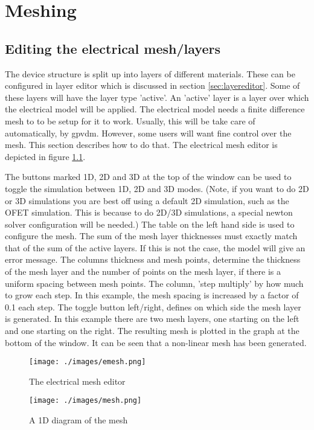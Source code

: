 \chapter{Meshing}
\label{ref:mesh}
\section{Editing the electrical mesh/layers}
The device structure is split up into layers of different materials.  These can be configured in layer editor which is discussed in section \ref{sec:layereditor}.  Some of these layers will have the layer type 'active'.  An 'active' layer is a layer over which the electrical model will be applied.  The electrical model needs a finite difference mesh to to be setup for it to work.  Usually, this will be take care of automatically, by gpvdm.  However, some users will want fine control over the mesh.  This section describes how to do that. The electrical mesh editor is depicted in figure \ref{fig:emesh}.

The buttons marked 1D, 2D and 3D at the top of the window can be used to toggle the simulation between 1D, 2D and 3D modes.  (Note, if you want to do 2D or 3D simulations you are best off using a default 2D simulation, such as the OFET simulation.  This is because to do 2D/3D simulations, a special newton solver configuration will be needed.) The table on the left hand side is used to configure the mesh.  The sum of the mesh layer thicknesses must exactly match that of the sum of the active layers.  If this is not the case, the model will give an error message.  The columns thickness and mesh points, determine the thickness of the mesh layer and the number of points on the mesh layer, if there is a uniform spacing between mesh points.  The column, 'step multiply' by how much to grow each step.  In this example, the mesh spacing is increased by a factor of 0.1 each step.  The toggle button left/right, defines on which side the mesh layer is generated.  In this example there are two mesh layers, one starting on the left and one starting on the right.  The resulting mesh is plotted in the graph at the bottom of the window.  It can be seen that a non-linear mesh has been generated.

\begin{figure}[H]
\centering
\texttt{[image: ./images/emesh.png]}
\caption{The electrical mesh editor}
\label{fig:emesh}
\end{figure}

\begin{figure}[H]
\centering
\texttt{[image: ./images/mesh.png]}
\caption{A 1D diagram of the mesh}
\label{fig:emeshdiagram}
\end{figure}

